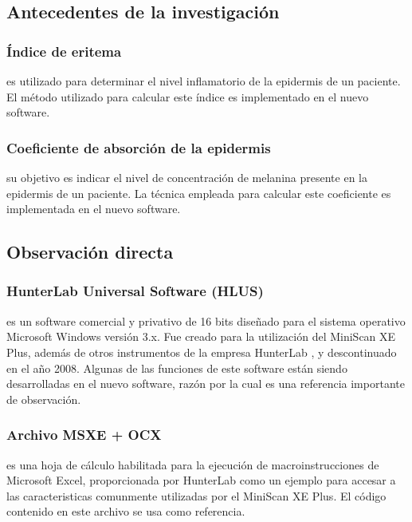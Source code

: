 \documentclass[conference]{IEEEtran}
\begin{document}
	\subsection{Antecedentes de la investigaci\'{o}n}
		
		\subsubsection{\'{I}ndice de eritema}
		es utilizado para determinar el nivel inflamatorio de la epidermis de un paciente. El m\'{e}todo utilizado para calcular este \'{i}ndice \cite{Wagner} es implementado en el nuevo software.
		
		\subsubsection{Coeficiente de absorci\'{o}n de la epidermis}
			 su objetivo es indicar el nivel de concentraci\'{o}n de melanina presente en la epidermis de un paciente. La t\'{e}cnica empleada para calcular este coeficiente \cite{Narea} es implementada en el nuevo software.
	
	\subsection{Observaci\'{o}n directa}

		\subsubsection{HunterLab Universal Software (HLUS)}
			es un software \mbox{comercial} y privativo de 16 bits dise\~{n}ado para el sistema \mbox{operativo} Microsoft Windows versi\'{o}n 3.x. Fue creado para la utilizaci\'{o}n del \mbox{MiniScan} XE Plus, adem\'{a}s de otros instrumentos de la empresa \mbox{HunterLab} \cite{HunterLab-manual}, y descontinuado en el a\~{n}o 2008. Algunas de las funciones de este software est\'{a}n siendo desarrolladas en el nuevo software, raz\'{o}n por la cual es una referencia importante de observaci\'{o}n.
		
		\subsubsection{Archivo MSXE + OCX}
		es una hoja de c\'{a}lculo habilitada para la ejecuci\'{o}n de macroinstrucciones de Microsoft Excel, proporcionada por HunterLab \cite{HunterLab} como un ejemplo para accesar a las caracteristicas comunmente utilizadas por el MiniScan XE Plus. El c\'{o}digo contenido en este archivo se usa como referencia.
	
\end{document}
